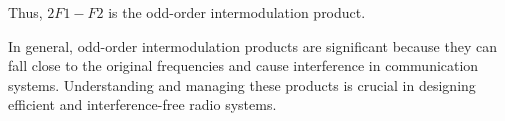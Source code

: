 Thus, \( 2F1 - F2 \) is the odd-order intermodulation product.

In general, odd-order intermodulation products are significant because they can fall close to the original frequencies and cause interference in communication systems. Understanding and managing these products is crucial in designing efficient and interference-free radio systems.

